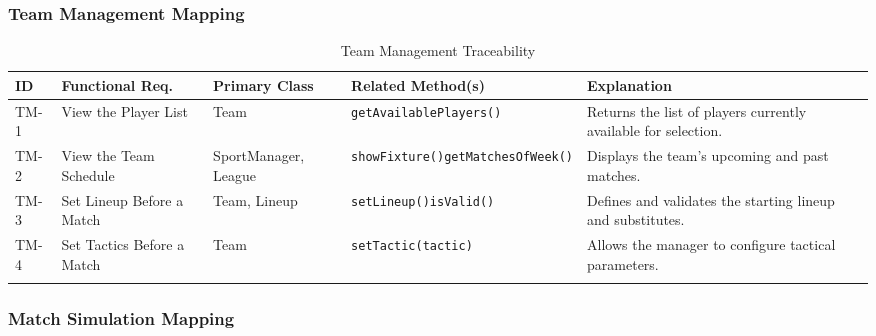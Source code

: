 \documentclass[12pt, a4paper]{article}
\begin{document}
\subsubsection*{Team Management Mapping}

{\footnotesize
\begin{longtable}{L{0.9cm} L{2.0cm} L{2.1cm} L{5.0cm} L{3.5cm}}
\toprule
\textbf{ID} & \textbf{Functional Req.} & \textbf{Primary Class} & \textbf{Related Method(s)} & \textbf{Explanation} \\
\midrule
\endhead
TM-1 & View the Player List   & Team                       & \texttt{getAvailablePlayers()} & Returns the list of players currently available for selection. \\[0.4em]
TM-2 & View the Team Schedule & SportManager, League       & \texttt{showFixture()}\newline\texttt{getMatchesOfWeek()} & Displays the team's upcoming and past matches. \\[0.4em]
TM-3 & Set Lineup Before a Match & Team, Lineup            & \texttt{setLineup()}\newline\texttt{isValid()} & Defines and validates the starting lineup and substitutes. \\[0.4em]
TM-4 & Set Tactics Before a Match & Team                   & \texttt{setTactic(tactic)} & Allows the manager to configure tactical parameters. \\
\bottomrule
\caption{Team Management Traceability}
\end{longtable}
}

\subsubsection*{Match Simulation Mapping}
\end{document}
